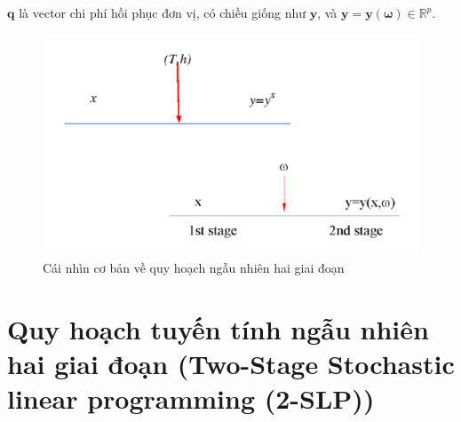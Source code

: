 \documentclass[a4paper]{article}
\begin{document}
    $\boldsymbol{q}$ là vector chi phí hồi phục đơn vị, có chiều giống như $\boldsymbol{y}$, 
    và $\boldsymbol{y = y(\omega)} \in \mathbb{R}^p$.
    \begin{figure}[ht]
        \centering
        \includegraphics{hinh2.png}
        \caption{Cái nhìn cơ bản về quy hoạch ngẫu nhiên hai giai đoạn}
    \end{figure}


\section{Quy hoạch tuyến tính ngẫu nhiên hai giai đoạn (Two-Stage Stochastic linear programming (2-SLP))}
\end{document}
